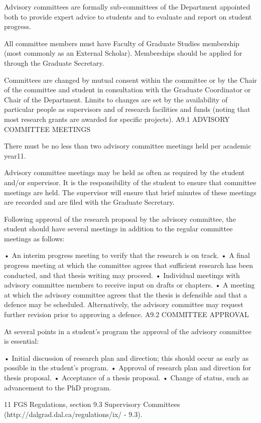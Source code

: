 Advisory committees are formally sub-committees of the Department appointed both to provide expert advice to students and to evaluate and report on student progress.

All committee members must have Faculty of Graduate Studies membership (most commonly as an External Scholar). Memberships should be applied for through the Graduate Secretary.

Committees are changed by mutual consent within the committee or by the Chair of the committee and student in consultation with the Graduate Coordinator or Chair of the Department. Limits to changes are set by the availability of particular people as supervisors and of research facilities and funds (noting that most research grants are awarded for specific projects).
A9.1	ADVISORY COMMITTEE MEETINGS

There must be no less than two advisory committee meetings held per academic year11.

Advisory committee meetings may be held as often as required by the student and/or supervisor. It is the responsibility of the student to ensure that committee meetings are held. The supervisor will ensure that brief minutes of these meetings are recorded and are filed with the Graduate Secretary.

Following approval of the research proposal by the advisory committee, the student should have several meetings in addition to the regular committee meetings as follows:

•	An interim progress meeting to verify that the research is on track.
•	A final progress meeting at which the committee agrees that sufficient research has been conducted, and that thesis writing may proceed.
•	Individual meetings with advisory committee members to receive input on drafts or chapters.
•	A meeting at which the advisory committee agrees that the thesis is defensible and that a defence may be scheduled. Alternatively, the advisory committee may request further revision prior to approving a defence.
A9.2	COMMITTEE APPROVAL

At several points in a student's program the approval of the advisory committee is essential:

•	Initial discussion of research plan and direction; this should occur as early as possible in the student's program.
•	Approval of research plan and direction for thesis proposal.
•	Acceptance of a thesis proposal.
•	Change of status, such as advancement to the PhD program.

11 FGS Regulations, section 9.3 Supervisory Committees (http://dalgrad.dal.ca/regulations/ix/ - 9.3).
 

